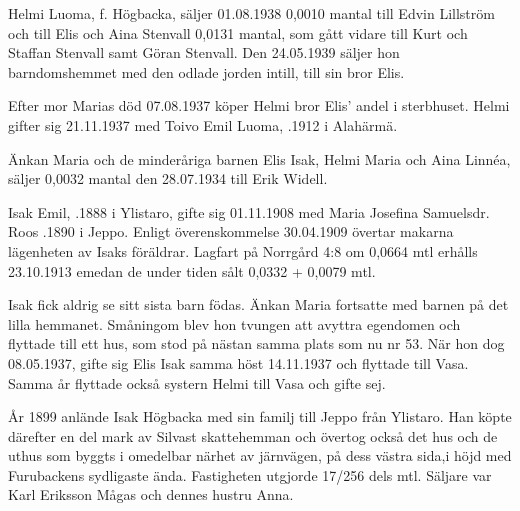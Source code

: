 Helmi Luoma, f. Högbacka, säljer 01.08.1938 0,0010 mantal till Edvin Lillström och till Elis och Aina Stenvall 0,0131 mantal, som gått vidare till Kurt och Staffan Stenvall samt Göran Stenvall. Den 24.05.1939 säljer hon barndomshemmet med den odlade jorden intill, till sin bror Elis.


Efter mor Marias död 07.08.1937 köper Helmi bror Elis' andel i sterbhuset. Helmi gifter sig 21.11.1937 med Toivo Emil Luoma, .1912 i Alahärmä.\jhvspace{}


Änkan Maria och de minderåriga barnen Elis Isak, Helmi Maria och Aina Linnéa, säljer 0,0032 mantal den 28.07.1934 till Erik Widell.\jhvspace{}


Isak Emil, .1888 i Ylistaro, gifte sig 01.11.1908 med Maria Josefina Samuelsdr. Roos .1890 i Jeppo. Enligt överenskommelse 30.04.1909 övertar makarna lägenheten av Isaks föräldrar. Lagfart på Norrgård 4:8 om 0,0664 mtl erhålls 23.10.1913 emedan de under tiden sålt 0,0332 + 0,0079 mtl.
\begin{jhchildren}
  \item {}
  \item {}
  \item {}
  \item {}
  \item {}
\end{jhchildren}
Isak fick aldrig se sitt sista barn födas. Änkan Maria fortsatte med barnen på det lilla hemmanet. Småningom blev hon tvungen att avyttra egendomen och flyttade till ett hus, som stod på nästan samma plats som nu nr 53. När hon dog 08.05.1937, gifte sig Elis Isak samma höst 14.11.1937 och flyttade till Vasa. Samma år flyttade också systern Helmi till Vasa och gifte sej.


År 1899 anlände Isak Högbacka med sin familj till Jeppo från Ylistaro. Han köpte därefter en del mark av Silvast skattehemman och övertog också det hus och de uthus som byggts i omedelbar närhet av järnvägen, på dess västra sida,i höjd med Furubackens sydligaste ända. Fastigheten utgjorde 17/256 dels mtl. Säljare var Karl Eriksson Mågas och dennes hustru Anna.

